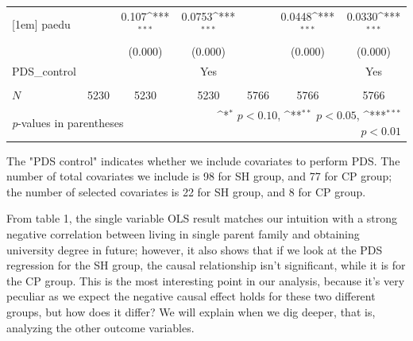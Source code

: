 \documentclass[]{AEA}
\def\sym#1{\ifmmode^{#1}\else\(^{#1}\)\fi}
\begin{document}
\begin{center}
\begin{table}
\begin{tabular}{l*{6}c}
    [1em]
    paedu       &                     &       0.107\sym{***}&      0.0753\sym{***}&                     &      0.0448\sym{***}&      0.0330\sym{***}\\
        &                     &     (0.000)         &     (0.000)         &                     &     (0.000)         &     (0.000)         \\
    [1em]
    PDS\_control  &   &  &  Yes    &  &    &  Yes \\
    &   &      &      &   &      &      \\
    \hline
    \(N\)       &        5230         &        5230         &        5230         &        5766         &        5766         &        5766         \\
    \bottomrule
    \multicolumn{3}{l}{\footnotesize \textit{p}-values in parentheses} & \multicolumn{4}{r}{\footnotesize \sym{*} \(p<0.10\), \sym{**} \(p<0.05\), \sym{***} \(p<0.01\)}\\
    \end{tabular}
    \begin{tablenotes}
        The "PDS control" indicates whether we include covariates to perform PDS.  The number of total covariates we include is 98 for SH group, and 77 for CP group; the number of selected covariates is 22 for SH group, and 8 for CP group.
    \end{tablenotes}
    \end{table}
    \end{center}

    From table 1, the single variable OLS result matches our intuition with a strong negative correlation between living in single parent family and obtaining university degree in future; however, it also shows that if we look at the PDS regression for the SH group, the causal relationship isn't significant, while it is for the CP group. This is the most interesting point in our analysis, because it's very peculiar as we expect the negative causal effect holds for these two different groups, but how does it differ?  We will explain when we dig deeper, that is, analyzing the other outcome variables.
\end{document}
